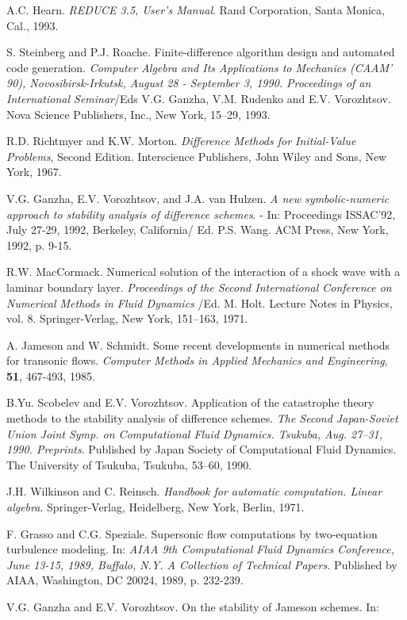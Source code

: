 \begin{description}
A.C. Hearn. {\em REDUCE 3.5, User's Manual}. Rand Corporation, Santa Monica,
Cal., 1993.
\item[10.]
S. Steinberg and P.J. Roache. Finite-difference algorithm design and
automated code generation. {\em Computer
Algebra and Its Applications to Mechanics (CAAM' 90), No\-vo\-si\-b\-irsk-Ir\-kutsk,
August 28 - September 3, 1990. Proceedings of an International Seminar}/Eds
V.G. Ganzha, V.M. Ruden\-ko and E.V. Vorozhtsov. Nova Science Publishers,
Inc., New York, 15--29, 1993.
\item[11.]
R.D. Richtmyer and K.W. Morton. {\em Difference Methods for Initial-Value
Problems}, Second Edition. Interscience Publishers, John Wiley and Sons,
New York, 1967.
\item[12.]
V.G. Ganzha, E.V. Vorozhtsov, and J.A. van Hulzen. {\em A new symbolic-numeric
approach to stability analysis of difference schemes}. - In: Proceedings
ISSAC'92, July 27-29, 1992, Berkeley, California/ Ed. P.S. Wang. ACM Press,
New York, 1992, p. 9-15.
\item[13.]
R.W. MacCormack. Numerical solution of the interaction of a shock wave
with a laminar boundary layer. {\em Proceedings of the Second International
Conference on Numerical Methods in Fluid Dynamics} /Ed. M. Holt. Lecture
Notes in Physics,  vol. 8. Springer-Verlag, New York, 151--163, 1971.
\item[14.]
A. Jameson and W. Schmidt. Some recent developments in numerical methods for
transonic flows.  {\em Computer Methods in Applied Mechanics and Engineering},
{\bf  51}, 467-493, 1985.
\item[15.]
B.Yu. Scobelev and E.V. Vorozhtsov. Application of the catastrophe
theory methods to the stability analysis of difference schemes. {\em
The Second Japan-Soviet Union Joint Symp. on Computational Fluid Dynamics.
Tsukuba, Aug. 27--31, 1990. Preprints}. Published by Japan Society of
Computational Fluid Dynamics. The University of Tsukuba, Tsukuba, 53--60, 1990.
\item[16.]
J.H. Wilkinson and C. Reinsch. {\em Handbook for automatic computation.
Linear algebra}. Springer-Verlag, Heidelberg, New York, Berlin, 1971.
\item[17.]
F. Grasso and C.G. Speziale. Supersonic flow computations by two-equati\-on
turbulence modeling. In: {\em AIAA 9th Computational Fluid Dynamics
Conference, June 13-15, 1989, Buffalo, N.Y. A Collection of Technical Papers.}
Published by AIAA, Washington, DC 20024, 1989, p. 232-239.
\item[18.]
V.G. Ganzha and E.V. Vorozhtsov. On the stability of Jameson schem\-es. In:

\end{description}

